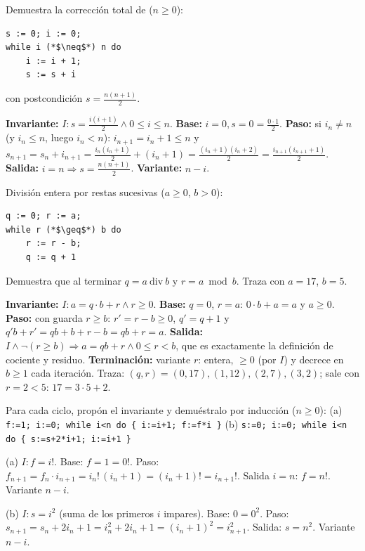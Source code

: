 \begin{prob}
Demuestra la corrección total de ($n\ge0$):
\begin{lstlisting}
s := 0; i := 0;
while i (*$\neq$*) n do
    i := i + 1;
    s := s + i
\end{lstlisting}
con postcondición $s=\frac{n(n+1)}{2}$.
\end{prob}
\begin{sol}
\textbf{Invariante:} $I: s=\frac{i(i+1)}{2}\land 0\le i\le n$.
\textbf{Base:} $i=0,s=0=\frac{0\cdot1}{2}$. \checkmark
\textbf{Paso:} si $i_n\ne n$ (y $i_n\le n$, luego $i_n<n$): $i_{n+1}=i_n+1\le n$ y
$s_{n+1}=s_n+i_{n+1}=\frac{i_n(i_n+1)}2+(i_n+1)=\frac{(i_n+1)(i_n+2)}{2}=\frac{i_{n+1}(i_{n+1}+1)}2$. \checkmark
\textbf{Salida:} $i=n\Rightarrow s=\frac{n(n+1)}2$. \quad \textbf{Variante:} $n-i$.
\end{sol}

\begin{prob}
División entera por restas sucesivas ($a\ge0$, $b>0$):
\begin{lstlisting}
q := 0; r := a;
while r (*$\geq$*) b do
    r := r - b;
    q := q + 1
\end{lstlisting}
Demuestra que al terminar $q=a\ \mathrm{div}\ b$ y $r=a\bmod b$. Traza con $a=17$, $b=5$.
\end{prob}
\begin{sol}
\textbf{Invariante:} $I: a=q\cdot b+r\land r\ge0$.
\textbf{Base:} $q=0$, $r=a$: $0\cdot b+a=a$ y $a\ge0$. \checkmark
\textbf{Paso:} con guarda $r\ge b$: $r'=r-b\ge0$, $q'=q+1$ y $q'b+r'=qb+b+r-b=qb+r=a$. \checkmark
\textbf{Salida:} $I\land\neg(r\ge b)\Rightarrow a=qb+r\land0\le r<b$, que es exactamente la definición de cociente y residuo.
\textbf{Terminación:} variante $r$: entera, $\ge0$ (por $I$) y decrece en $b\ge1$ cada iteración.
Traza: $(q,r)=(0,17),(1,12),(2,7),(3,2)$; sale con $r=2<5$: $17=3\cdot5+2$. \checkmark
\end{sol}

\begin{prob}
Para cada ciclo, propón el invariante y demuéstralo por inducción ($n\ge0$):
(a) \texttt{f:=1; i:=0; while i<n do \{ i:=i+1; f:=f*i \}} \qquad
(b) \texttt{s:=0; i:=0; while i<n do \{ s:=s+2*i+1; i:=i+1 \}}
\end{prob}
\begin{sol}
(a) $I: f=i!$. Base: $f=1=0!$. Paso: $f_{n+1}=f_n\cdot i_{n+1}=i_n!\,(i_n+1)=(i_n+1)!=i_{n+1}!$. Salida $i=n$: $f=n!$. Variante $n-i$.

(b) $I: s=i^2$ (suma de los primeros $i$ impares). Base: $0=0^2$. Paso: $s_{n+1}=s_n+2i_n+1=i_n^2+2i_n+1=(i_n+1)^2=i_{n+1}^2$. Salida: $s=n^2$. Variante $n-i$.
\end{sol}

